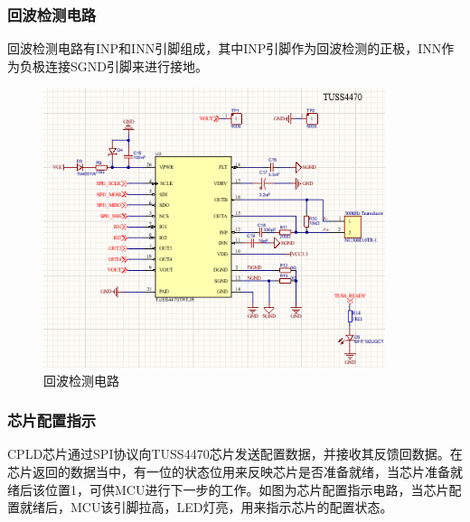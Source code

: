     \subsubsection{回波检测电路}
    回波检测电路有INP和INN引脚组成，其中INP引脚作为回波检测的正极，INN作为负极连接SGND引脚来进行接地。
     \begin{figure}[ht]
    	\centering
    	\includegraphics[width=10cm]{figure/TUSS4470 peripheral circuit.png}
    	\caption{回波检测电路}
    	\label{回波检测电路}
    \end{figure}
    \subsubsection{芯片配置指示}
    CPLD芯片通过SPI协议向TUSS4470芯片发送配置数据，并接收其反馈回数据。在芯片返回的数据当中，有一位的状态位用来反映芯片是否准备就绪，当芯片准备就绪后该位置1，可供MCU进行下一步的工作。如图为芯片配置指示电路，当芯片配置就绪后，MCU该引脚拉高，LED灯亮，用来指示芯片的配置状态。
    
